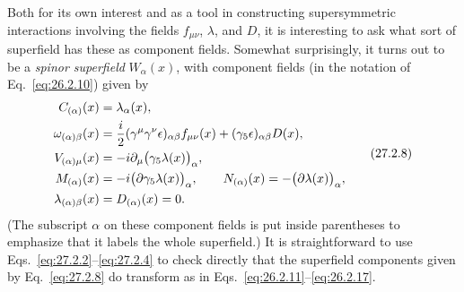 Both for its own interest and as a tool in constructing supersymmetric
interactions involving the fields \(f_{\mu\nu}\), \(\lambda\), and \(D\),
it is interesting to ask what sort of superfield has these as component
fields. Somewhat surprisingly, it turns out to be a \textit{spinor
superfield} \(W_\alpha(x)\), with component fields (in the notation of
Eq.~\eqref{eq:26.2.10}) given by
\begin{equation}
  \begin{aligned}
  C_{(\alpha)}(x)&=\lambda_\alpha(x),
  \\
  \omega_{(\alpha)\beta}(x)
  &=\frac{i}{2}(\gamma^\mu\gamma^\nu\epsilon)_{\alpha\beta}
    f_{\mu\nu}(x)+(\gamma_5\epsilon)_{\alpha\beta}D(x),
  \\
  V_{(\alpha)\mu}(x)
  &=-i\partial_\mu\bigl(\gamma_5\lambda(x)\bigr)_\alpha,
  \\
  M_{(\alpha)}(x)
  &=-i\bigl(\sl{\partial}\gamma_5\lambda(x)\bigr)_\alpha,
  \qquad
  N_{(\alpha)}(x)=-\bigl(\sl{\partial}\lambda(x)\bigr)_\alpha,
  \\
  \lambda_{(\alpha)\beta}(x)&=D_{(\alpha)}(x)=0.
  \end{aligned}
  \tag{27.2.8}\label{eq:27.2.8}
\end{equation}
(The subscript \(\alpha\) on these component fields is put inside
parentheses to emphasize that it labels the whole superfield.) It is
straightforward to use Eqs.~\eqref{eq:27.2.2}--\eqref{eq:27.2.4} to
check directly that the superfield components given by
Eq.~\eqref{eq:27.2.8} do transform as in
Eqs.~\eqref{eq:26.2.11}--\eqref{eq:26.2.17}.

